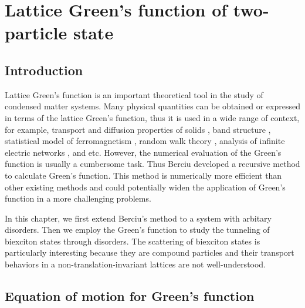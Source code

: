 \chapter{Lattice Green's function of two-particle state}
\label{ch:greenfunc}

\section{Introduction}
\label{sec:introGreenFunc}

Lattice Green's function is an important theoretical tool in the study of condensed matter systems. Many physical
quantities can be obtained or expressed in terms of the lattice Green's function, thus it is used in a wide range of
context, for example, transport and diffusion properties of solids \cite{economou2006}, band structure 
\cite{koster1954}, statistical model 
of ferromagnetism \cite{mccoy1978, dalton1967, lax1952}, random walk theory \cite{montroll1965},  analysis of 
infinite electric networks \cite{cserti2000, cserti2002, asad2004, asad2005}, and etc. 
However, the numerical evaluation of the Green's function is usually a cumbersome task\cite{Berciu2010}. Thus
Berciu developed a recursive method \cite{Berciu2010, Berciu2011, Berciu2012} to calculate Green's function. This
method is numerically more efficient than other existing methods and could potentially widen the application of 
Green's function in a more challenging problems. 

In this chapter, we first extend Berciu's method to a system with arbitary disorders. Then we employ the Green's 
function to study the tunneling of biexciton states through disorders. The scattering of biexciton states is particularly
interesting because they are compound particles and their transport behaviors in a non-translation-invariant lattices 
are not well-understood\cite{bulatov2005}.

\section{Equation of motion for Green's function}
\label{sec:equationOfMotion}

